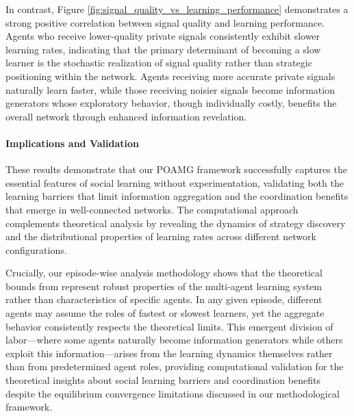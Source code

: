 In contrast, Figure \ref{fig:signal_quality_vs_learning_performance} demonstrates a strong positive correlation between signal quality and learning performance. Agents who receive lower-quality private signals consistently exhibit slower learning rates, indicating that the primary determinant of becoming a slow learner is the stochastic realization of signal quality rather than strategic positioning within the network. Agents receiving more accurate private signals naturally learn faster, while those receiving noisier signals become information generators whose exploratory behavior, though individually costly, benefits the overall network through enhanced information revelation.\fi

\paragraph{Implications and Validation} These results demonstrate that our POAMG framework successfully captures the essential features of social learning without experimentation, validating both the learning barriers that limit information aggregation and the coordination benefits that emerge in well-connected networks. The computational approach complements theoretical analysis by revealing the dynamics of strategy discovery and the distributional properties of learning rates across different network configurations.

Crucially, our episode-wise analysis methodology shows that the theoretical bounds from \citet{brandl2024} represent robust properties of the multi-agent learning system rather than characteristics of specific agents. In any given episode, different agents may assume the roles of fastest or slowest learners, yet the aggregate behavior consistently respects the theoretical limits. This emergent division of labor—where some agents naturally become information generators while others exploit this information—arises from the learning dynamics themselves rather than from predetermined agent roles, providing computational validation for the theoretical insights about social learning barriers and coordination benefits despite the equilibrium convergence limitations discussed in our methodological framework.


